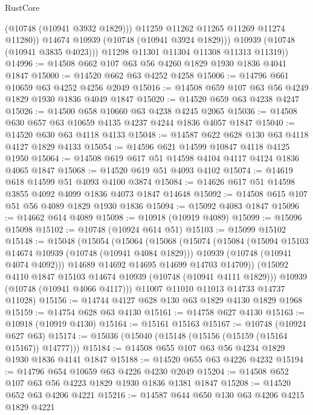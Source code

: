 \begin{lexlean}{RustCore}
\begin{coremodule}
                  (@10748 (@10941 @3932 @1829)))
                @11259
                @11262
                @11265
                @11269
                @11274
                @11280))
            @14674
            @10939
            (@10748 (@10941 @3924 @1829)))
          @10939
          (@10748 (@10941 @3835 @4023)))
        @11298
        @11301
        @11304
        @11308
        @11313
        @11319))
@14996 := @14508 @662 @107 @63 @56 @4260 @1829 @1930 @1836 @4041 @1847
@15000 := @14520 @662 @63 @4252 @4258
@15006 := @14796 @661 @10659 @63 @4252 @4256 @2049
@15016 := @14508 @659 @107 @63 @56 @4249 @1829 @1930 @1836 @4049 @1847
@15020 := @14520 @659 @63 @4238 @4247
@15026 := @14500 @658 @10660 @63 @4238 @4245 @2065
@15036 := @14508 @630 @657 @63 @10659 @4135 @4237 @4244 @1836 @4057 @1847
@15040 := @14520 @630 @63 @4118 @4133
@15048 := @14587 @622 @628 @130 @63 @4118 @4127 @1829 @4133
@15054 := @14596 @621 @14599 @10847 @4118 @4125 @1950
@15064 := @14508 @619 @617 @51 @14598 @4104 @4117 @4124 @1836 @4065 @1847
@15068 := @14520 @619 @51 @4093 @4102
@15074 := @14619 @618 @14599 @51 @4093 @4100 @3874
@15084 := @14626 @617 @51 @14598 @3855 @4092 @4099 @1836 @4073 @1847 @14648
@15092 := @14508 @615 @107 @51 @56 @4089 @1829 @1930 @1836
@15094 := @15092 @4083 @1847
@15096 := @14662 @614 @4089
@15098 := @10918 (@10919 @4089)
@15099 := @15096 @15098
@15102 := @10748 (@10924 @614 @51)
@15103 := @15099 @15102
@15148 := @15048
    (@15054
      (@15064
        (@15068
          (@15074
            (@15084
              (@15094 @15103 @14674 @10939 (@10748 (@10941 @4084 @1829)))
              @10939
              (@10748 (@10941 @4074 @4092)))
            @14689
            @14692
            @14695
            @14699
            @14703
            @14709))
        (@15092 @4110 @1847 @15103 @14674 @10939 (@10748 (@10941 @4111 @1829)))
        @10939
        (@10748 (@10941 @4066 @4117)))
      @11007
      @11010
      @11013
      @14733
      @14737
      @11028)
@15156 := @14744 @4127 @628 @130 @63 @1829 @4130 @1829 @1968
@15159 := @14754 @628 @63 @4130
@15161 := @14758 @627 @4130
@15163 := @10918 (@10919 @4130)
@15164 := @15161 @15163
@15167 := @10748 (@10924 @627 @63)
@15174 := @15036 (@15040 (@15148 (@15156 (@15159 (@15164 @15167)) @14777)))
@15184 := @14508 @655 @107 @63 @56 @4234 @1829 @1930 @1836 @4141 @1847
@15188 := @14520 @655 @63 @4226 @4232
@15194 := @14796 @654 @10659 @63 @4226 @4230 @2049
@15204 := @14508 @652 @107 @63 @56 @4223 @1829 @1930 @1836 @1381 @1847
@15208 := @14520 @652 @63 @4206 @4221
@15216 := @14587 @644 @650 @130 @63 @4206 @4215 @1829 @4221

\end{coremodule}
\end{lexlean}
